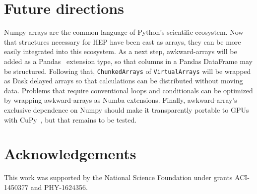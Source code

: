 \documentclass{webofc}
\begin{document}
\section{Future directions}

Numpy arrays are the common language of Python's scientific ecosystem. Now that structures necessary for HEP have been cast as arrays, they can be more easily integrated into this ecosystem. As a next step, awkward-arrays will be added as a Pandas~\cite{pandas} extension type, so that columns in a Pandas DataFrame may be structured. Following that, {\tt\small ChunkedArrays} of {\tt\small VirtualArrays} will be wrapped as Dask delayed arrays so that calculations can be distributed without moving data. Problems that require conventional loops and conditionals can be optimized by wrapping awkward-arrays as Numba extensions. Finally, awkward-array's exclusive dependence on Numpy should make it transparently portable to GPUs with CuPy~\cite{cupy}, but that remains to be tested.

\section{Acknowledgements}

This work was supported by the National Science Foundation under grants ACI-1450377 and PHY-1624356.
\end{document}
